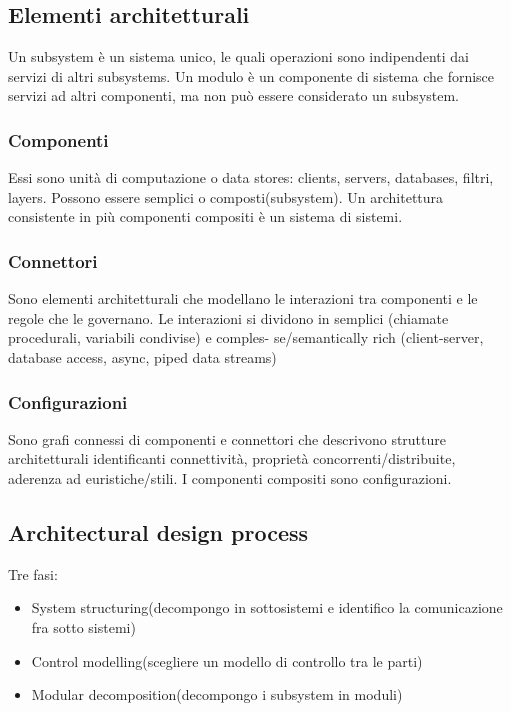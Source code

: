 \documentclass{article}
\begin{document}
\subsection{Elementi architetturali}
Un subsystem è un sistema unico, le quali operazioni sono indipendenti dai servizi di altri subsystems. Un
modulo è un componente di sistema che fornisce servizi ad altri componenti, ma non può essere considerato
un subsystem.

\subsubsection{Componenti}
Essi sono unità di computazione o data stores: clients, servers, databases, filtri, layers.
Possono essere semplici o composti(subsystem). Un architettura consistente in più componenti compositi
è un sistema di sistemi.

\subsubsection{Connettori}
Sono elementi architetturali che modellano le interazioni tra componenti e le regole che le
governano. Le interazioni si dividono in semplici (chiamate procedurali, variabili condivise) e comples-
se/semantically rich (client-server, database access, async, piped data streams)


\subsubsection{Configurazioni}
Sono grafi connessi di componenti e connettori che descrivono strutture architetturali
identificanti connettività, proprietà concorrenti/distribuite, aderenza ad euristiche/stili. I componenti
compositi sono configurazioni.



\subsection{Architectural design process}
Tre fasi:
\begin{itemize}
    \item System structuring(decompongo in sottosistemi e identifico la comunicazione fra sotto sistemi)
    \item Control modelling(scegliere un modello di controllo tra le parti)
    \item Modular decomposition(decompongo i subsystem in moduli)
\end{itemize}
\end{document}
